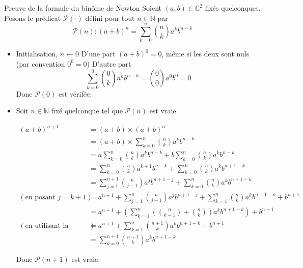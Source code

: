 \documentclass{article}
\renewenvironment{question_kholle}[2][ ]
{
	\subsection{\texorpdfstring{#2}{}}
	\notblank{#1}
	{
		\noindent #1
		\bigbreak
	}
	{}
	\begin{proof}
}
{
	\end{proof}
}
\begin{document}
\begin{question_kholle}[{Pour tout $(a, b) \in \C^2$, $n \in \N$: $$(a+b)^{n} = \sum_{k=0}^{n}\binom n k a^{k} b^{n-k}$$}]{Preuve de la formule du binôme de Newton}
    Soient $(a, b) \in \mathbb{C}^{2}$ fixés quelconques.
    Posons le prédicat $\mathcal{P}(\cdot)$ défini pour tout $n \in \mathbb{N}$ par
    $$
    \mathcal{P}(n): (a+b)^{n} = \sum_{k=0}^{n}\binom n k a^{k} b^{n-k}
    $$
    \begin{itemize}[label=$\star$]
        \item Initialisation, $n \leftarrow 0$
        D'une part $(a+b)^{0} = 0$, même si les deux sont nuls (par convention $0^{0} =0$)
        D'autre part
        $$
        \sum_{k=0}^{0}\binom 0 k a^{k}b^{n-k} = \binom 0 0 a^{0} b^{0} = 0
        $$
        Donc $\mathcal{P}(0)$ est vérifée.
        
        \item Soit $n \in \mathbb{N}$ fixé quelconque tel que $\mathcal{P}(n)$ est vraie
        
        \begin{align*}
            (a+b)^{n+1} &= (a+b)\times(a+b)^{n} \\
            &= (a+b) \times \sum_{k=0}^{n}\binom n k a^{k} b^{n-k} \\
            &= a\sum_{k=0}^{n}\binom n k a^{k} b^{n-k} + b\sum_{k=0}^{n}\binom n k a^{k} b^{n-k} \\
            &= \sum_{k=0}^{n}\binom n k a^{k+1} b^{n-k} + \sum_{k=0}^{n}\binom n k a^{k} b^{n+1-k} \\
            &= \sum_{j=1}^{n+1}\binom n {j-1} a^{j} b^{n+1-j} + \sum_{k=0}^{n}\binom n k a^{k} b^{n+1-k} \\
            (\text{en posant } j = k + 1) &= a^{n+1} + \sum_{j=1}^{n}\binom n {j-1} a^{j} b^{n+1-j} + \sum_{k=1}^{n}\binom n k a^{k} b^{n+1-k} + b^{n+1} \\
            &= a^{n+1} + \left( \sum_{k=1}^{n} \left(\binom n {k-1} + \binom n k \right) a^{k} b^{n+1-k} \right) + b^{n+1} \\
            (\text{en utilisant la relation de Pascal}) &= a^{n+1} + \sum_{k=1}^{n} \binom {n+1} k a^{k} b^{n+1-k} + b^{n+1} \\
            &=\sum_{k=0}^{n+1} \binom {n+1} k a^{k} b^{n+1-k}
        \end{align*}
        
        Donc $\mathcal{P}(n+1)$ est vraie.
    \end{itemize}
\end{question_kholle}
\end{document}
